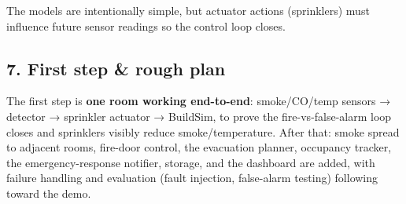 \documentclass[
  10pt,
]{article}
\begin{document}
The models are intentionally simple, but actuator actions (sprinklers)
must influence future sensor readings so the control loop closes.

\subsection{7. First step \& rough plan}\label{first-step-rough-plan}

The first step is \textbf{one room working end-to-end}: smoke/CO/temp
sensors → detector → sprinkler actuator → BuildSim, to prove the
fire-vs-false-alarm loop closes and sprinklers visibly reduce
smoke/temperature. After that: smoke spread to adjacent rooms, fire-door
control, the evacuation planner, occupancy tracker, the
emergency-response notifier, storage, and the dashboard are added, with
failure handling and evaluation (fault injection, false-alarm testing)
following toward the demo.
\end{document}
